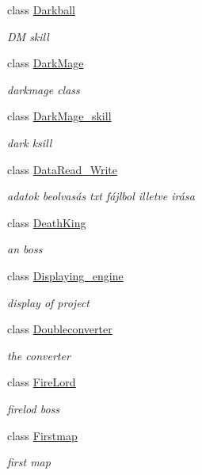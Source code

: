 \begin{DoxyCompactItemize}
class \hyperlink{class_lightdeath_1_1_darkball}{Darkball}
\begin{DoxyCompactList}\small\item\em DM skill \end{DoxyCompactList}\item 
class \hyperlink{class_lightdeath_1_1_dark_mage}{Dark\+Mage}
\begin{DoxyCompactList}\small\item\em darkmage class \end{DoxyCompactList}\item 
class \hyperlink{class_lightdeath_1_1_dark_mage__skill}{Dark\+Mage\+\_\+skill}
\begin{DoxyCompactList}\small\item\em dark ksill \end{DoxyCompactList}\item 
class \hyperlink{class_lightdeath_1_1_data_read___write}{Data\+Read\+\_\+\+Write}
\begin{DoxyCompactList}\small\item\em adatok beolvasás txt fájlbol illetve irása \end{DoxyCompactList}\item 
class \hyperlink{class_lightdeath_1_1_death_king}{Death\+King}
\begin{DoxyCompactList}\small\item\em an boss \end{DoxyCompactList}\item 
class \hyperlink{class_lightdeath_1_1_displaying__engine}{Displaying\+\_\+engine}
\begin{DoxyCompactList}\small\item\em display of project \end{DoxyCompactList}\item 
class \hyperlink{class_lightdeath_1_1_doubleconverter}{Doubleconverter}
\begin{DoxyCompactList}\small\item\em the converter \end{DoxyCompactList}\item 
class \hyperlink{class_lightdeath_1_1_fire_lord}{Fire\+Lord}
\begin{DoxyCompactList}\small\item\em firelod boss \end{DoxyCompactList}\item 
class \hyperlink{class_lightdeath_1_1_firstmap}{Firstmap}
\begin{DoxyCompactList}\small\item\em first map \end{DoxyCompactList}\item 

\end{DoxyCompactItemize}
